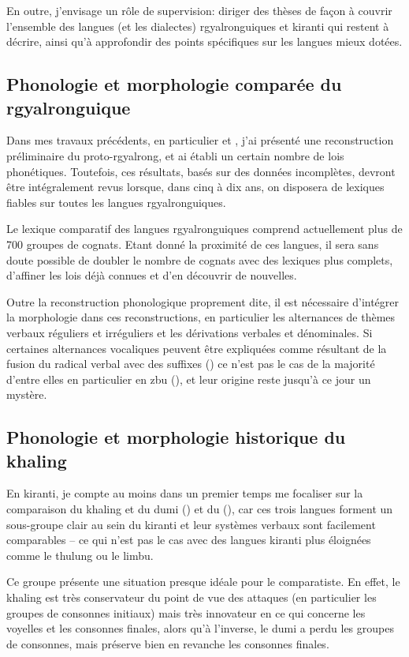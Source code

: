 \documentclass[oldfontcommands,oneside,a4paper,11pt]{article}
\begin{document}
En outre, j'envisage un rôle de supervision: diriger des thèses de façon à couvrir l'ensemble des langues (et les dialectes) rgyalronguiques et kiranti qui restent à décrire, ainsi qu'à approfondir des points spécifiques sur les langues mieux dotées.


\subsection{Phonologie et morphologie comparée du rgyalronguique}
Dans mes travaux précédents, en particulier \citet{jacques04these} et \citet{jacques14esquisse}, j'ai présenté une reconstruction préliminaire du proto-rgyalrong, et ai établi un certain nombre de lois phonétiques. Toutefois, ces résultats, basés sur des données incomplètes, devront être intégralement revus lorsque, dans cinq à dix ans, on disposera de lexiques fiables sur toutes les langues rgyalronguiques.

Le lexique comparatif des langues rgyalronguiques comprend actuellement plus de 700 groupes de cognats. Etant donné la proximité de ces langues, il sera sans doute possible de doubler le nombre de cognats avec des lexiques plus complets,  d'affiner les lois déjà connues et d'en découvrir de nouvelles. 

Outre la reconstruction phonologique proprement dite, il est nécessaire d'intégrer la morphologie dans ces reconstructions, en particulier les alternances de thèmes verbaux réguliers et irréguliers et les dérivations verbales et dénominales. Si certaines alternances vocaliques peuvent être expliquées comme résultant de la fusion du radical verbal avec des suffixes (\citealt[357-8]{jacques04these}) ce n'est pas le cas de la majorité d'entre elles en particulier en zbu (\citealt{jackson04showu}), et leur origine reste jusqu'à ce jour un mystère.

\subsection{Phonologie et morphologie historique du khaling}
En kiranti, je compte au moins dans un premier temps me focaliser sur la comparaison du khaling et du dumi (\citealt{driem93dumi}) et du (\citealt{lahaussois09}), car ces trois langues forment un sous-groupe clair au sein du kiranti et leur systèmes verbaux sont facilement comparables -- ce qui n'est pas le cas avec des langues kiranti plus éloignées comme le thulung ou le limbu.

Ce groupe présente une situation presque idéale pour le comparatiste. En effet, le khaling est très conservateur du point de vue des attaques (en particulier les groupes de consonnes initiaux) mais très innovateur en ce qui concerne les voyelles et les consonnes finales, alors qu'à l'inverse, le dumi a perdu les groupes de consonnes, mais préserve bien en revanche les consonnes finales. 
\end{document}
